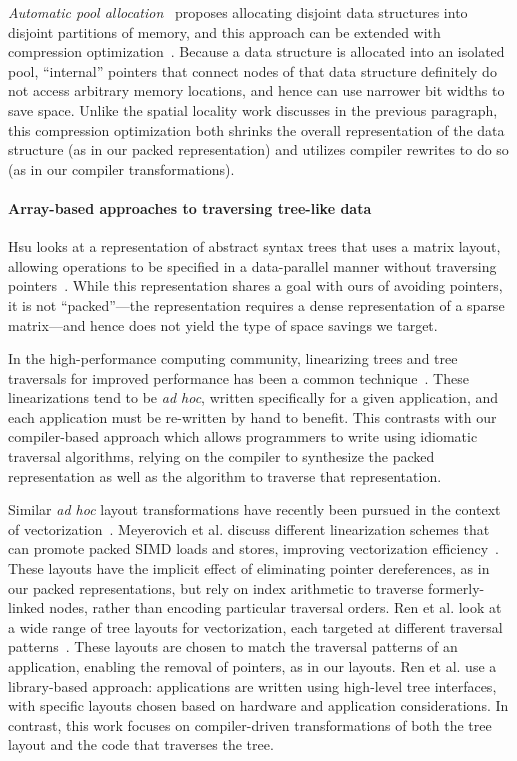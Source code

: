 \documentclass[showabstract,showacknowledgments,showpreface,showdedication,school]{iuphd}
\theoremstyle{nonumberplain}
\begin{document}
\emph{Automatic pool allocation}~\cite{Lattner2005} proposes
allocating disjoint data structures into disjoint partitions of
memory, and this approach can be extended with compression
optimization~\cite{Lattner2005mspc}. Because a data structure is
allocated into an isolated pool, ``internal'' pointers that connect
nodes of that data structure definitely do not access arbitrary memory
locations, and hence can use narrower bit widths to save space. Unlike
the spatial locality work discusses in the previous paragraph, this
compression optimization both shrinks the overall representation of
the data structure (as in our packed representation) and utilizes
compiler rewrites to do so (as in our compiler transformations).


\paragraph{Array-based approaches to traversing tree-like data}

Hsu looks at a representation of abstract syntax trees that uses a matrix
layout, allowing operations to be specified in a data-parallel manner without
traversing pointers~\cite{hsu2016key}. While this representation shares a goal
with ours of avoiding pointers, it is not ``packed''---the representation
requires a dense representation of a sparse matrix---and hence does not yield
the type of space savings we target.

In the high-performance computing community, linearizing trees and tree traversals for improved
performance has been a common technique~\cite{makino90,goldfarb13sc}. These
linearizations tend to be {\em ad hoc}, written specifically for a given
application, and each application must be re-written by hand to benefit. This
contrasts with our compiler-based approach which allows programmers to write
using idiomatic traversal algorithms, relying on the compiler to synthesize
the packed representation as well as the algorithm to traverse that
representation.

Similar \emph{ad hoc} layout transformations have recently been pursued in the
context of vectorization~\cite{Meyerovich2011,ren13cgo,ren14taco}. Meyerovich
et al. discuss different linearization schemes that can promote packed SIMD
loads and stores, improving vectorization efficiency~\cite{Meyerovich2011}.
These layouts have the implicit effect of eliminating pointer dereferences, as
in our packed representations, but rely on index arithmetic to traverse
formerly-linked nodes, rather than encoding particular traversal orders. Ren
et al. look at a wide range of tree layouts for vectorization, each targeted
at different traversal patterns~\cite{ren13cgo,ren14taco}. These layouts are
chosen to match the traversal patterns of an application, enabling the removal
of pointers, as in our layouts. Ren et al. use a library-based approach:
applications are written using high-level tree interfaces, with specific
layouts chosen based on hardware and application considerations. In contrast,
this work focuses on compiler-driven transformations of both the tree layout
and the code that traverses the tree.
\end{document}
